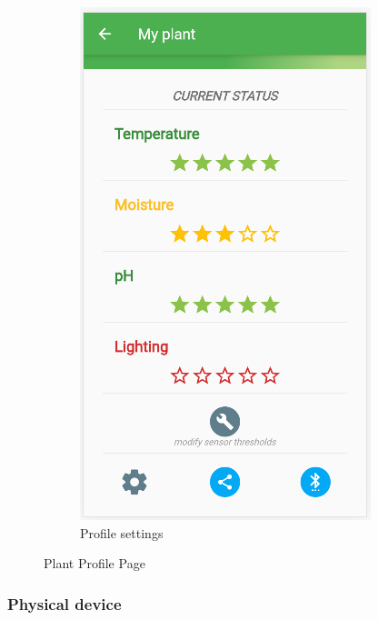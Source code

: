 \begin{figure}[!ht]
\begin{subfigure}[b]{0.3\columnwidth}
        \includegraphics[width=\columnwidth]{images/profile2.png}
        \caption{Profile settings}
    \end{subfigure}
    \caption{Plant Profile Page}
    \label{fig:Plant Profile Page}
\end{figure}

\subsubsection{Physical device}

